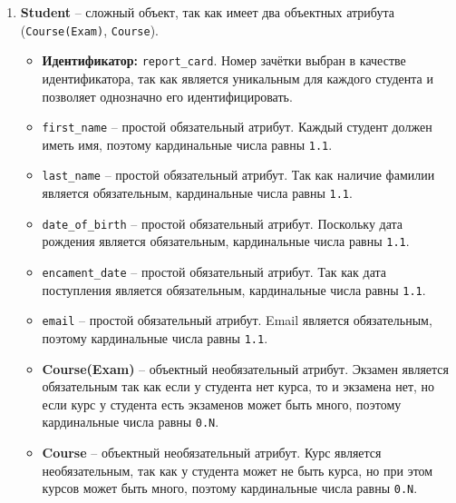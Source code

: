 \documentclass[a4paper, 14pt]{extarticle}
\begin{document}
\begin{enumerate}
    \item \textbf{Student} -- сложный объект, так как имеет два объектных атрибута (\texttt{Course(Exam)}, \texttt{Course}).
    \begin{itemize}
        \item \textbf{Идентификатор:} \texttt{report\_card}. 
        Номер зачётки выбран в качестве идентификатора, так как является уникальным для каждого студента и позволяет однозначно его идентифицировать.
        \item \texttt{first\_name} – простой обязательный атрибут. Каждый студент должен иметь имя, поэтому кардинальные числа равны \texttt{1.1}.
        \item \texttt{last\_name} – простой обязательный атрибут. Так как наличие фамилии является обязательным, кардинальные числа равны \texttt{1.1}.
        \item \texttt{date\_of\_birth} – простой обязательный атрибут. Поскольку дата рождения является обязательным, кардинальные числа равны \texttt{1.1}.
        \item \texttt{encament\_date} – простой обязательный атрибут. Так как дата поступления является обязательным, кардинальные числа равны \texttt{1.1}.
        \item \texttt{email} – простой обязательный атрибут. Email является обязательным, поэтому кардинальные числа равны \texttt{1.1}.
        \item \textbf{Course(Exam)} – объектный необязательный атрибут. Экзамен является обязательным так как если у студента нет курса, то и экзамена нет, но если курс у студента есть экзаменов может быть много, поэтому кардинальные числа равны \texttt{0.N}.
        \item \textbf{Course} – объектный необязательный атрибут. Курс является необязательным, так как у студента может не быть курса, но при этом курсов может быть много, поэтому кардинальные числа равны \texttt{0.N}.
    \end{itemize}


\end{enumerate}
\end{document}
